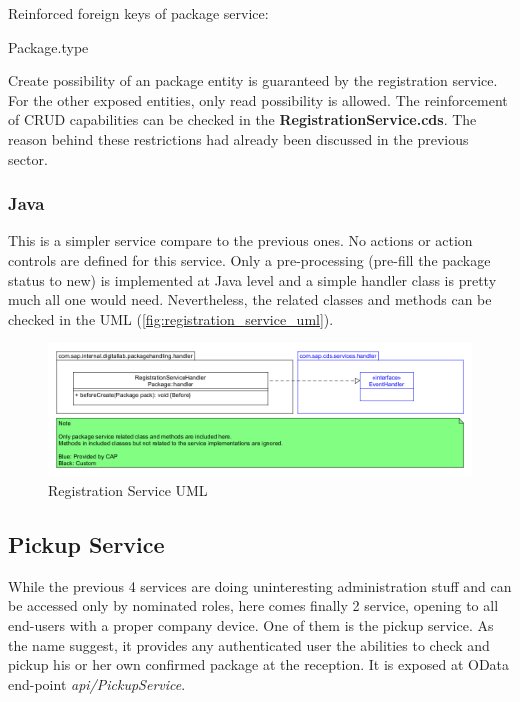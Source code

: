 \bigskip
Reinforced foreign keys of package service:
\begin{compactenum}
	\item Package.type
\end{compactenum}

\bigskip
Create possibility of an package entity is guaranteed by the registration service. For the other exposed entities, only read possibility is allowed. The reinforcement of CRUD capabilities can be checked in the \textbf{RegistrationService.cds}. The reason behind these restrictions had already been discussed in the previous sector.

\subsubsection{Java}

This is a simpler service compare to the previous ones. No actions or action controls are defined for this service. Only a pre-processing (pre-fill the package status to new) is implemented at Java level and a simple handler class is pretty much all one would need. Nevertheless, the related classes and methods can be checked in the UML (\autoref{fig:registration_service_uml}). 

\begin{figure}[H]
    \centering
    \includegraphics[width=1\linewidth]{images/service_class_diagrams/registration_service_class_diagram.png}
    \caption{Registration Service UML}
    \label{fig:registration_service_uml}
\end{figure}
\pagebreak




\subsection{Pickup Service}

While the previous 4 services are doing uninteresting administration stuff and can be accessed only by nominated roles, here comes finally 2 service, opening to all end-users with a proper company device. One of them is the pickup service. As the name suggest, it provides any authenticated user the abilities to check and pickup his or her own confirmed package at the reception. It is exposed at OData end-point \textit{api/PickupService}. 


